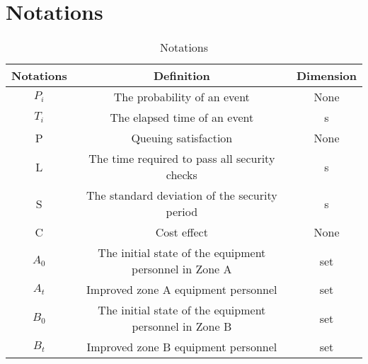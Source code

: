
\section{Notations}
\begin{table}[H]
\centering
\caption{Notations}\label{tab:notations}
\begin{tabular}{|c|c|c|}
\hline
Notations& Definition& Dimension\\ \hline
$P_{i}$& The probability of an event & None \\
\hline
$T_{i}$& The elapsed time of an event & s \\\hline
P & Queuing satisfaction & None \\\hline
L & The time required to pass all security checks & s \\\hline
S & The standard deviation of the security period & s \\\hline
C & Cost effect & None \\\hline
$A_{0}$ & The initial state of the equipment personnel in Zone A & set \\\hline
$A_{t}$ & Improved zone A equipment personnel & set \\\hline
$B_{0}$ & The initial state of the equipment personnel in Zone B & set \\\hline
$B_{t}$ & Improved zone B equipment personnel & set \\
\hline
\end{tabular}
\end{table}